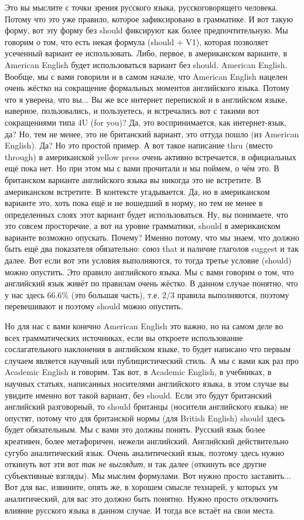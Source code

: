 \documentclass[main.tex]{subfiles}
\begin{document}
Это вы мыслите с точки зрения русского языка, русскоговорящего человека.
Потому что это уже правило, которое зафиксировано в грамматике.
И вот такую форму, вот эту форму без should фиксируют как более предпочтительную.
Мы говорим о том, что есть некая формула (should + V1), которая позволяет усеченный вариант ее использовать.
Либо, первое, в американском варианте, в American English будет использоваться вариант без should.
American English.
Вообще, мы с вами говорили и в самом начале, что American English нацелен очень жёстко на сокращение формальных моментов английского языка.
Потому что я уверена, что вы...
Вы же все интернет перепиской и в английском языке, наверное, пользовались, и пользуетесь, и встречались вот с такими вот сокращениями типа 4U (for you)?
Да, это воспринимается, как интернет-язык, да?
Но, тем не менее, это не британский вариант, это оттуда пошло (из American English).
Да?
Но это простой пример.
А вот такое написание thru (вместо through) в американской yellow press очень активно встречается, в официальных ещё пока нет.
Но при этом мы с вами прочитали и мы поймем, о чём это.
В британском варианте английского языка вы никогда это не встретите.
В американском встретите.
В контексте угадывается.
Да, но в американском варианте это, хоть пока ещё и не вошедший в норму, но тем не менее в определенных слоях этот вариант будет использоваться.
Ну, вы понимаете, что это совсем просторечие, а вот на уровне грамматики, should в американском варианте возможно опускать.
Почему?
Именно потому, что мы знаем, что должно быть ещё два показателя обязательно: союз that и наличие глаголов suggest и так далее.
Вот если вот эти условия выполняются, то тогда третье условие (should) можно опустить.
Это правило английского языка.
Мы с вами говорим о том, что английский язык живёт по правилам очень жёстко.
В данном случае понятно, что у нас здесь 66.6\% (это большая часть), т.е. $2/3$ правила выполняются, поэтому перевешивают и поэтому should можно опустить.

Но для нас с вами конечно American English это важно, но на самом деле во всех грамматических источниках, если вы откроете использование сослагательного наклонения в английском языке, то будет написано что первым случаем является научный или публицистический стиль.
А мы с вами как раз про Academic English и говорим.
Так вот, в Academic English, в учебниках, в научных статьях, написанных носителями английского языка, в этом случае вы увидите именно вот такой вариант, без should.
Если это будут британский английский разговорный, то should британцы (носители английского языка) не опустят, потому что для британской нормы (для British English) should здесь будет обязательным.
Мы с вами это должны понять.
Русский язык более креативен, более метафоричен, нежели английский.
Английский действительно сугубо аналитический язык.
Очень аналитический язык, поэтому здесь нужно откинуть вот эти вот \textit{так не выглядит}, и так далее (откинуть все другие субъективные взгляды).
Мы мыслим формулами.
Вот нужно просто заставить...
Вот для вас, извините, опять же, в хорошем смысле технарей, у которых ум аналитический, для вас это должно быть понятно.
Нужно просто отключить влияние русского языка в данном случае.
И тогда все встаёт на свои места.
\end{document}
